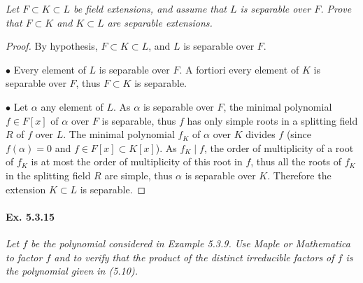 \documentclass[11pt,a4paper]{article}
\begin{document}
{\it Let $F \subset K \subset L$ be field extensions, and assume that $L$ is separable over $F$. Prove that $F \subset K$ and $K \subset L$ are separable extensions.
}

\begin{proof}
By hypothesis, $F\subset K \subset L$, and $L$ is separable over $F$.

$\bullet$ Every element of $L$ is separable over $F$. A fortiori every element of  $K$ is separable over $F$, thus $F \subset K$ is separable.

$\bullet$ Let $\alpha$  any element of $L$. As $\alpha$ is separable over $F$, the minimal polynomial $f \in F[x]$ of  $\alpha$ over $F$ is separable, thus $f$ has only simple roots in a splitting field $R$ of $f$ over $L$. The minimal polynomial $f_K$ of $\alpha$ over $K$ divides $f$ (since $f(\alpha) = 0$ and $f\in F[x] \subset K[x]$). As $f_K \mid f$, the order of multiplicity of a root of $f_K$ is at most the order of multiplicity of this root in $f$, thus all the roots of $f_K$ in the splitting field $R$ are simple, thus $\alpha$ is separable over $K$. Therefore the extension $K \subset L$ is separable.
\end{proof}

\paragraph{Ex. 5.3.15}

{\it Let $f$ be the polynomial considered in Example 5.3.9. Use Maple or Mathematica to factor $f$ and to verify that the product of the distinct irreducible factors of $f$ is the polynomial given in (5.10).
}
\end{document}
